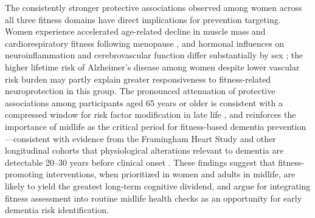\documentclass{article}
\begin{document}
The consistently stronger protective associations observed among women 
across all three fitness domains have direct implications for prevention 
targeting.
Women experience accelerated age-related decline in muscle mass and 
cardiorespiratory fitness following menopause \citep{maltais2009muscle, 
samson2000grip}, and hormonal influences on neuroinflammation and 
cerebrovascular function differ substantially by sex 
\citep{gillies2014sex, scheyer2018estrogen}; the higher lifetime risk 
of Alzheimer's disease among women despite lower vascular risk burden 
\citep{beam2018womensad} may partly explain greater responsiveness to 
fitness-related neuroprotection in this group.
The pronounced attenuation of protective associations among participants 
aged 65 years or older is consistent with a compressed window for risk 
factor modification in late life \citep{norton2014potential}, and 
reinforces the importance of midlife as the critical period for 
fitness-based dementia prevention—consistent with evidence from the 
Framingham Heart Study and other longitudinal cohorts that physiological 
alterations relevant to dementia are detectable 20--30 years before 
clinical onset \citep{seshadri2002framingham, jack2010hypothetical}.
These findings suggest that fitness-promoting interventions, when 
prioritized in women and adults in midlife, are likely to yield the 
greatest long-term cognitive dividend, and argue for integrating fitness 
assessment into routine midlife health checks as an opportunity for 
early dementia risk identification.
\end{document}
